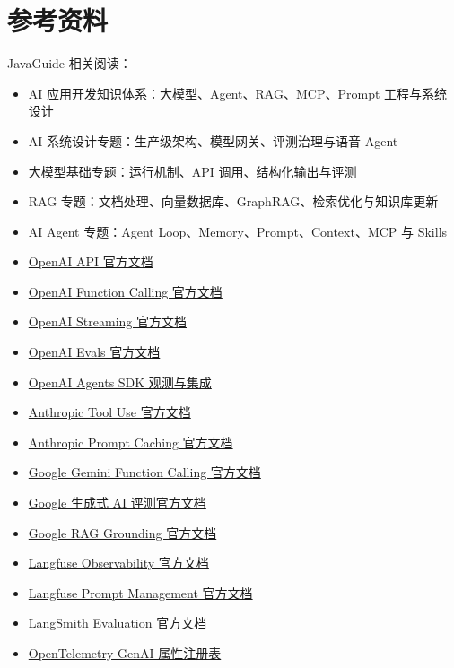 \documentclass[9pt,a4paper,twocolumn]{ctexart}
\begin{document}
\section*{参考资料}


JavaGuide 相关阅读：


\begin{itemize}[itemsep=1pt, topsep=2pt]
  \item AI 应用开发知识体系：大模型、Agent、RAG、MCP、Prompt 工程与系统设计
  \item AI 系统设计专题：生产级架构、模型网关、评测治理与语音 Agent
  \item 大模型基础专题：运行机制、API 调用、结构化输出与评测
  \item RAG 专题：文档处理、向量数据库、GraphRAG、检索优化与知识库更新
  \item AI Agent 专题：Agent Loop、Memory、Prompt、Context、MCP 与 Skills
  \item \href{https://developers.openai.com/api/docs}{OpenAI API 官方文档}
  \item \href{https://developers.openai.com/api/docs/guides/function-calling}{OpenAI Function Calling 官方文档}
  \item \href{https://developers.openai.com/api/docs/guides/streaming-responses}{OpenAI Streaming 官方文档}
  \item \href{https://developers.openai.com/api/docs/guides/evals}{OpenAI Evals 官方文档}
  \item \href{https://developers.openai.com/api/docs/guides/agents/integrations-observability}{OpenAI Agents SDK 观测与集成}
  \item \href{https://platform.claude.com/docs/en/agents-and-tools/tool-use/overview}{Anthropic Tool Use 官方文档}
  \item \href{https://platform.claude.com/docs/en/build-with-claude/prompt-caching}{Anthropic Prompt Caching 官方文档}
  \item \href{https://docs.cloud.google.com/gemini-enterprise-agent-platform/models/tools/function-calling}{Google Gemini Function Calling 官方文档}
  \item \href{https://docs.cloud.google.com/gemini-enterprise-agent-platform/models/evaluation-overview}{Google 生成式 AI 评测官方文档}
  \item \href{https://docs.cloud.google.com/gemini-enterprise-agent-platform/models/grounding/ground-responses-using-rag}{Google RAG Grounding 官方文档}
  \item \href{https://langfuse.com/docs/observability/overview}{Langfuse Observability 官方文档}
  \item \href{https://langfuse.com/docs/prompt-management/overview}{Langfuse Prompt Management 官方文档}
  \item \href{https://docs.langchain.com/langsmith/evaluation}{LangSmith Evaluation 官方文档}
  \item \href{https://opentelemetry.io/docs/specs/semconv/registry/attributes/gen-ai/}{OpenTelemetry GenAI 属性注册表}
\end{itemize}
\end{document}

